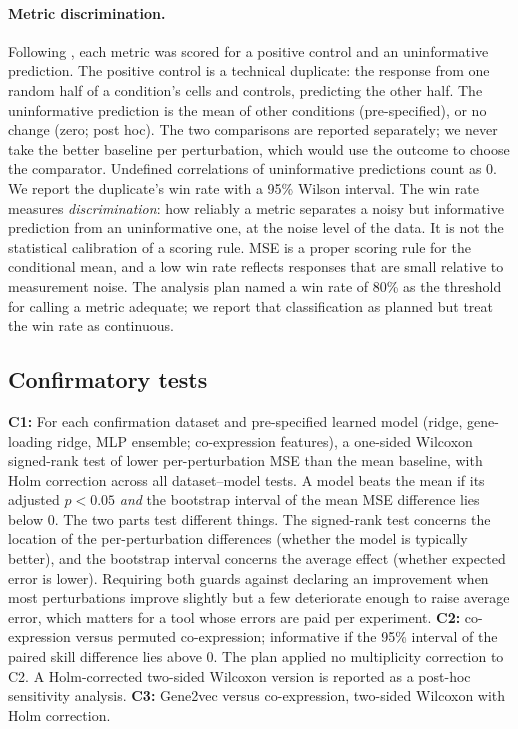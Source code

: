 \paragraph{Metric discrimination.} Following \citet{miller2026}, each metric was scored for a positive control and an uninformative prediction. The positive control is a technical duplicate: the response from one random half of a condition's cells and controls, predicting the other half. The uninformative prediction is the mean of other conditions (pre-specified), or no change (zero; post hoc). The two comparisons are reported separately; we never take the better baseline per perturbation, which would use the outcome to choose the comparator. Undefined correlations of uninformative predictions count as 0. We report the duplicate's win rate with a 95\% Wilson interval. The win rate measures \emph{discrimination}: how reliably a metric separates a noisy but informative prediction from an uninformative one, at the noise level of the data. It is not the statistical calibration of a scoring rule. MSE is a proper scoring rule for the conditional mean, and a low win rate reflects responses that are small relative to measurement noise. The analysis plan named a win rate of 80\% as the threshold for calling a metric adequate; we report that classification as planned but treat the win rate as continuous.

\subsection{Confirmatory tests}
\textbf{C1:} For each confirmation dataset and pre-specified learned model (ridge, gene-loading ridge, MLP ensemble; co-expression features), a one-sided Wilcoxon signed-rank test of lower per-perturbation MSE than the mean baseline, with Holm correction \citep{holm1979} across all dataset--model tests. A model beats the mean if its adjusted $p<0.05$ \emph{and} the bootstrap interval of the mean MSE difference lies below 0. The two parts test different things. The signed-rank test concerns the location of the per-perturbation differences (whether the model is typically better), and the bootstrap interval concerns the average effect (whether expected error is lower). Requiring both guards against declaring an improvement when most perturbations improve slightly but a few deteriorate enough to raise average error, which matters for a tool whose errors are paid per experiment. \textbf{C2:} co-expression versus permuted co-expression; informative if the 95\% interval of the paired skill difference lies above 0. The plan applied no multiplicity correction to C2. A Holm-corrected two-sided Wilcoxon version is reported as a post-hoc sensitivity analysis. \textbf{C3:} Gene2vec versus co-expression, two-sided Wilcoxon with Holm correction.

